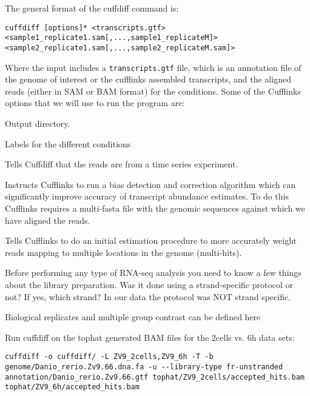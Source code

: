 \begin{information}
The general format of the cuffdiff command is:

\begin{lstlisting}[style=command_syntax]
cuffdiff [options]* <transcripts.gtf> <sample1_replicate1.sam[,...,sample1_replicateM]> <sample2_replicate1.sam[,...,sample2_replicateM.sam]>
\end{lstlisting}

Where the input includes a \texttt{transcripts.gtf} file, which is an annotation
file of the genome of interest or the cufflinks assembled transcripts, and the aligned reads (either in SAM or BAM
format) for the conditions.
Some of the Cufflinks options that we will use to run the program are:

\begin{description}[style=multiline,labelindent=0cm,align=right,leftmargin=\descriptionlabelspace,rightmargin=1.5cm,font=\ttfamily]
  \item[-o] Output directory.
  \item[-L] Labels for the different conditions
  \item[-T] Tells Cuffdiff that the reads are from a time series experiment.
  \item[-b] Instructs Cufflinks to run a bias detection and correction algorithm
  which can significantly improve accuracy of transcript abundance estimates.
  To do this Cufflinks requires a multi-fasta file with the genomic sequences
  against which we have aligned the reads.
  \item[-u] Tells Cufflinks to do an initial estimation procedure to more
  accurately weight reads mapping to multiple locations in the genome
  (multi-hits). 
  \item[--library-type] Before performing any type of RNA-seq analysis you need
 to know a few things about the library preparation. Was it done using a
 strand-specific protocol or not? If yes, which strand? In our data the protocol
 was NOT strand specific.
  \item[-C] Biological replicates and multiple group contrast can be defined here 
\end{description}
\end{information}

\begin{steps}
Run cuffdiff on the tophat generated BAM files for the 2cells vs. 6h data sets:
\begin{lstlisting}
cuffdiff -o cuffdiff/ -L ZV9_2cells,ZV9_6h -T -b genome/Danio_rerio.Zv9.66.dna.fa -u --library-type fr-unstranded annotation/Danio_rerio.Zv9.66.gtf tophat/ZV9_2cells/accepted_hits.bam tophat/ZV9_6h/accepted_hits.bam
\end{lstlisting}
\end{steps}

